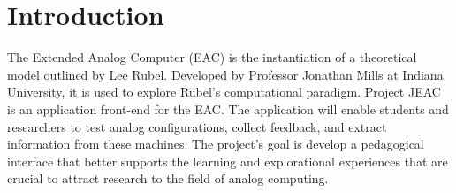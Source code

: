 \chapter{Introduction}
The Extended Analog Computer (EAC) is the instantiation of a theoretical model outlined by Lee Rubel.  Developed by Professor Jonathan Mills at Indiana University, it is used to explore Rubel's computational paradigm.  Project JEAC is an application front-end for the EAC.  The application will enable students and researchers to test analog configurations, collect feedback, and extract information from these machines.  The project's goal is develop a pedagogical interface that better supports the learning and explorational experiences that are crucial to attract research to the field of analog computing.

